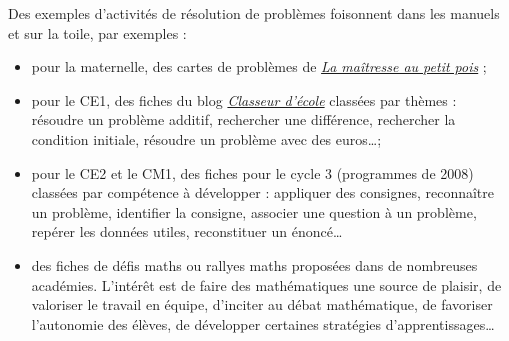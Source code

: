 \begin{exercice*} %
Des exemples d'activités de résolution de problèmes foisonnent dans les manuels et sur la toile, par exemples :
\begin{itemize}
   \item pour la maternelle, des cartes de problèmes de \href{http://lamaitresseaupetitpois.eklablog.com/des-problemes-mathematiques-en-maternelle-a157565476}{\it\blue La maîtresse au petit pois} ;
   \item pour le CE1, des fiches du blog \href{https://classeurdecole.wordpress.com/2012/02/07/resolution-de-problemes-ce1-2/}{\it\blue Classeur d'école} classées par thèmes : résoudre un problème additif, rechercher une différence, rechercher la condition initiale, résoudre un problème avec des euros\dots ;
   \item pour le CE2 et le CM1, des fiches pour le cycle 3 (programmes de 2008) classées par compétence à développer : appliquer des consignes, reconnaître un problème, identifier la consigne, associer une question à un problème, repérer les données utiles, reconstituer un énoncé\dots
   \item des fiches de défis maths ou rallyes maths proposées dans de nombreuses académies. L'intérêt est de faire des mathématiques une source de plaisir, de valoriser le travail en équipe, d'inciter au débat mathématique, de favoriser l'autonomie des élèves, de développer certaines stratégies d'apprentissages\dots
\end{itemize}
\end{exercice*}

\bigskip

